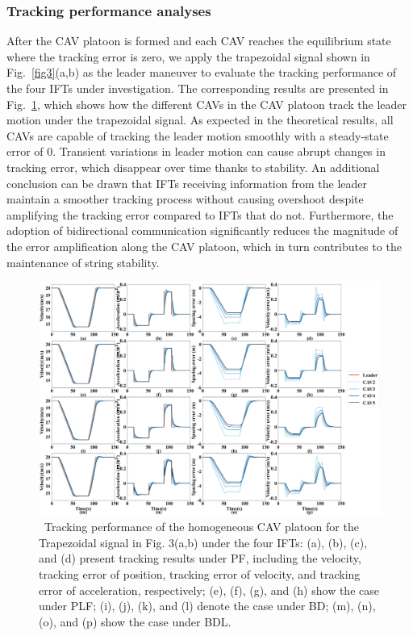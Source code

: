 \documentclass[a4paper]{cas-sc}
\begin{document}
\subsubsection{Tracking performance analyses}
\label{Section 5.2.1}
After the CAV platoon is formed and each CAV reaches the equilibrium state where the tracking error is zero, we apply the trapezoidal signal shown in Fig.~\ref{fig3}(a,b) as the leader maneuver to evaluate the tracking performance of the four IFTs under investigation. The corresponding results are presented in Fig.~\ref{fig4}, which shows how the different CAVs in the CAV platoon track the leader motion under the trapezoidal signal. As expected in the theoretical results, all CAVs are capable of tracking the leader motion smoothly with a steady-state error of 0. Transient variations in leader motion can cause abrupt changes in tracking error, which disappear over time thanks to stability. An additional conclusion can be drawn that IFTs receiving information from the leader maintain a smoother tracking process without causing overshoot despite amplifying the tracking error compared to IFTs that do not. Furthermore, the adoption of bidirectional communication significantly reduces the magnitude of the error amplification along the CAV platoon, which in turn contributes to the maintenance of string stability.

\begin{figure}

  \centering
  \includegraphics[width=14cm]{figs/fig4.png}
  \caption{~Tracking performance of the homogeneous CAV platoon for the Trapezoidal signal in Fig. 3(a,b) under the four IFTs: (a), (b), (c), and (d) present tracking results under PF, including the velocity, tracking error of position, tracking error of velocity, and tracking error of acceleration, respectively; (e), (f), (g), and (h) show the case under PLF; (i), (j), (k), and (l) denote the case under BD; (m), (n), (o), and (p) show the case under BDL.}
  \label{fig4}
\end{figure}
\end{document}
